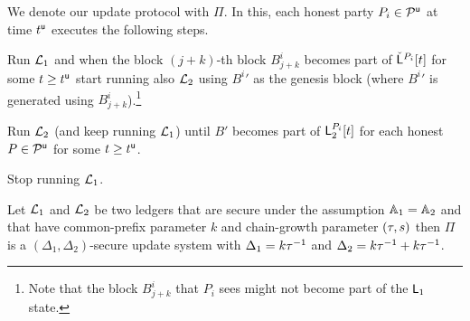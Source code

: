 We denote our update protocol with $\Pi$. In this, each honest party $P_i\in\mathcal{P}^\mathsf{u}$ at time $t^{\mathsf{u}}$ executes the following steps.

\begin{myenumerate}
	\item Run $\mathcal{L}_1$ and when the block $(j+k)$-th block $B^i_{j+k}$ becomes part of $\check {\mathsf{L}}^{P_i}[t]$ for some $t\geq t^{\mathsf{u}}$
	start running also $\mathcal{L}_2$ using ${B^i}'$ as the genesis block (where ${B^i}'$ is generated using $B^i_{j+k}$).\footnote{Note that the block
	 $B^i_{j+k}$ that $P_i$ sees might not become part of the $\mathsf{L}_1$ state.}
	\item Run $\mathcal{L}_2$ (and keep running $\mathcal{L}_1$) until $B'$ becomes part of $\mathsf{L}_2^{P_i}[t]$ 
	for each honest $P\in\mathcal{P}^\mathsf{u}$ for some $t\geq t^{\mathsf{u}}$.
	\item Stop running $\mathcal{L}_1$.
\end{myenumerate}



\begin{theorem}\label{th:main}
Let $\mathcal{L}_1$ and $\mathcal{L}_2$ be two ledgers that are secure under the assumption $\mathbb{A}_1=\mathbb{A}_2$ and
that have common-prefix parameter $k$ and chain-growth parameter $(\tau, s)$ then
 $\Pi$ is a $(\Delta_1,\Delta_2)$-secure update system with $\Delta_1=k\tau^{-1}$ and $\Delta_2=k \tau^{-1} + k \tau^{-1}$.
\end{theorem}

